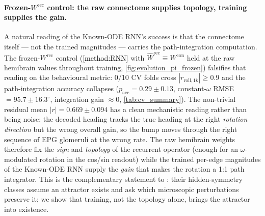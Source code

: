 \documentclass[11pt]{article}
\begin{document}
\paragraph{Frozen-$W^{\mathrm{rec}}$ control: the raw connectome supplies topology, training supplies the gain.}
A natural reading of the Known-ODE RNN's success is that the
connectome itself --- not the trained magnitudes --- carries the
path-integration computation. The frozen-$W^{\mathrm{rec}}$ control
(\cref{method:RNN} with $\hat W^{\mathrm{rec}} \equiv W^{\mathrm{con}}$
held at the raw hemibrain values throughout training,
\cref{fig:evolution_pi_frozen}) falsifies that reading on the
behavioural metric: 0/10 CV folds cross $|r_{\mathrm{roll},1k}| \ge
0.9$ and the path-integration accuracy collapses
($p_{\mathrm{acc}} = 0.29 \pm 0.13$, constant-$\omega$ RMSE
$= 95.7 \pm 16.3^\circ$, integration gain $\approx 0$,
\cref{tab:cv_summary}). The non-trivial residual mean
$|r| = 0.669 \pm 0.094$ has a clean mechanistic reading rather
than being noise: the decoded heading tracks the true heading at
the right \emph{rotation direction} but the wrong overall gain,
so the bump moves through the right sequence of EPG glomeruli at
the wrong rate. The raw hemibrain weights therefore fix the
\emph{sign} and \emph{topology} of the recurrent operator (enough
for an $\omega$-modulated rotation in the cos/sin readout) while
the trained per-edge magnitudes of the Known-ODE RNN supply the
\emph{gain} that makes the rotation a 1:1 path integrator. This
is the complementary statement to \citet{hulse2026}: their
hidden-symmetry classes assume an attractor exists and ask which
microscopic perturbations preserve it; we show that training, not
the topology alone, brings the attractor into existence.
\end{document}
